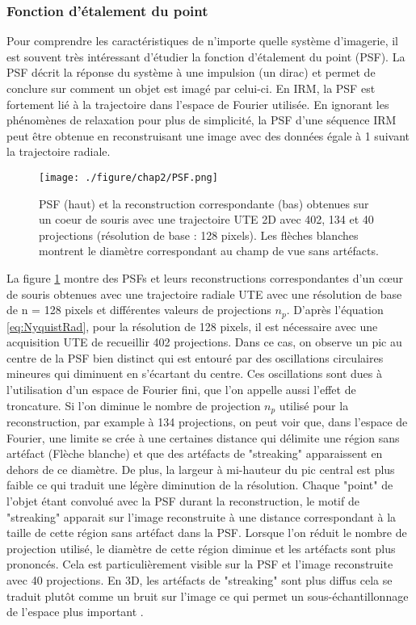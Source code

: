 \subsubsection{Fonction d'étalement du point}

Pour comprendre les caractéristiques de n'importe quelle système d'imagerie, il est souvent très intéressant d'étudier la fonction d'étalement du point (PSF). La PSF décrit la réponse du système à une impulsion (un dirac) et permet de conclure sur comment un objet est imagé par celui-ci. En IRM, la PSF est fortement lié à la trajectoire dans l'espace de Fourier utilisée. En ignorant les phénomènes de relaxation pour plus de simplicité, la PSF d'une séquence IRM peut être obtenue en reconstruisant une image avec des données égale à 1 suivant la trajectoire radiale.

\begin{figure}[H]
\centering
\texttt{[image: ./figure/chap2/PSF.png]}
\caption[PSF]{\label{fig:PSF} PSF (haut) et la reconstruction correspondante (bas) obtenues sur un coeur de souris avec une trajectoire UTE 2D avec 402, 134 et 40 projections (résolution de base : 128 pixels). Les flèches blanches montrent le diamètre correspondant au champ de vue sans artéfacts.}
\end{figure}

La figure \ref{fig:PSF} montre des PSFs et leurs reconstructions correspondantes d'un cœur de souris obtenues avec une trajectoire radiale UTE avec une résolution de base de n = 128 pixels et différentes valeurs de projections $n_p$. D'après l'équation \ref{eq:NyquistRad}, pour la résolution de 128 pixels, il est nécessaire avec une acquisition UTE de recueillir 402 projections. Dans ce cas, on observe un pic au centre de la PSF bien distinct qui est entouré par des oscillations circulaires mineures qui diminuent en s'écartant du centre. Ces oscillations sont dues à l'utilisation d'un espace de Fourier fini, que l'on appelle aussi l'effet de troncature. Si l'on diminue le nombre de projection $n_p$ utilisé pour la reconstruction, par example à 134 projections,  on peut voir que, dans l'espace de Fourier, une limite se crée à une certaines distance qui délimite une région sans artéfact (Flèche blanche) \cite{Scheffler:1998fk} et que des artéfacts de "streaking" apparaissent en dehors de ce diamètre. De plus, la largeur à mi-hauteur du pic central est plus faible ce qui traduit une légère diminution de la résolution. Chaque "point" de l'objet étant convolué avec la PSF durant la reconstruction, le motif de "streaking" apparait sur l'image reconstruite à une distance correspondant à la taille de cette région sans artéfact dans la PSF. Lorsque l'on réduit le nombre de projection utilisé, le diamètre de cette région diminue et les artéfacts sont plus prononcés. Cela est particulièrement visible sur la PSF et l'image reconstruite avec 40 projections.
En 3D, les artéfacts de "streaking" sont plus diffus cela se traduit plutôt comme un bruit sur l'image ce qui permet un sous-échantillonnage de l'espace plus important \cite{Gu:2005aa}.

